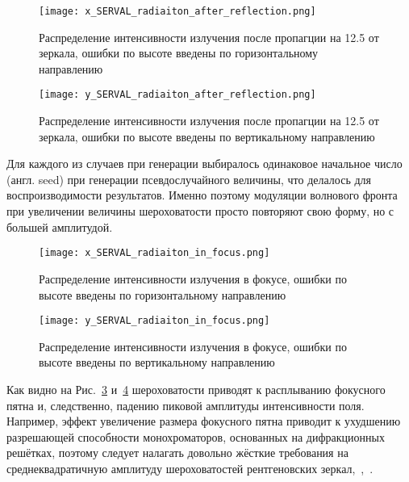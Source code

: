 \begin{figure}[H] 
	\centering 	\texttt{[image: x\_SERVAL\_radiaiton\_after\_reflection.png]}
	\caption{Распределение интенсивности излучения после пропагции на 12.5 от зеркала, ошибки по высоте введены по горизонтальному направлению}
	\label{fig:x_SERVAL_radiaiton_after_reflection}
\end{figure}

\begin{figure}[H] 
	\centering 	\texttt{[image: y\_SERVAL\_radiaiton\_after\_reflection.png]}
	\caption{Распределение интенсивности излучения после пропагции на 12.5 от зеркала, ошибки по высоте введены по вертикальному направлению}
	\label{fig:y_SERVAL_radiaiton_after_reflection}
\end{figure}
Для каждого из случаев при генерации выбиралось одинаковое начальное число (англ. seed) при генерации псевдослучайного величины, что делалось для воспроизводимости результатов. Именно поэтому модуляции волнового фронта при увеличении величины шероховатости просто повторяют свою форму, но с большей амплитудой.
\begin{figure}[H] 
	\centering 	\texttt{[image: x\_SERVAL\_radiaiton\_in\_focus.png]}
	\caption{Распределение интенсивности излучения в фокусе, ошибки по высоте введены по горизонтальному направлению}
	\label{fig:x_SERVAL_radiaiton_in_focus}
\end{figure}

\begin{figure}[H] 
	\centering 	\texttt{[image: y\_SERVAL\_radiaiton\_in\_focus.png]}
	\caption{Распределение интенсивности излучения в фокусе, ошибки по высоте введены по вертикальному направлению}
	\label{fig:y_SERVAL_radiaiton_in_focus}
\end{figure}

Как видно на Рис.~\ref{fig:x_SERVAL_radiaiton_in_focus} и~\ref{fig:y_SERVAL_radiaiton_in_focus} шероховатости приводят к расплыванию фокусного пятна и, следственно, падению пиковой амплитуды интенсивности поля. Например, эффект увеличение размера фокусного пятна приводит к ухудшению разрешающей способности монохроматоров, основанных на дифракционных решётках, поэтому следует налагать довольно жёсткие требования на среднеквадратичную амплитуду шероховатостей рентгеновских зеркал,~\cite{strocov_high-resolution_2010},~\cite{sankari_hippie_nodate}. 


